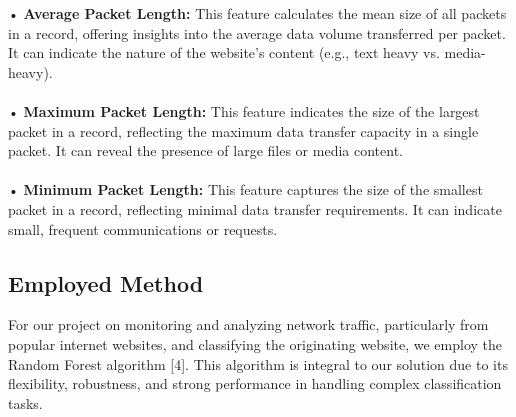 \documentclass[10pt,sigconf,letterpaper,nonacm]{acmart}
\begin{document}
• \textbf{Average Packet Length:} This feature calculates the
mean size of all packets in a record, offering insights into
the average data volume transferred per packet. It can
indicate the nature of the website’s content (e.g., text
heavy vs. media-heavy).\\\\
• \textbf{Maximum Packet Length:} This feature indicates the
size of the largest packet in a record, reflecting the maximum data transfer capacity in a single packet. It can
reveal the presence of large files or media content.\\\\
• \textbf{Minimum Packet Length:} This feature captures the
size of the smallest packet in a record, reflecting minimal
data transfer requirements. It can indicate small, frequent
communications or requests.

\subsection{Employed Method}
For our project on monitoring and analyzing network traffic,
particularly from popular internet websites, and classifying
the originating website, we employ the Random Forest algorithm [4]. This algorithm is integral to our solution due to its
flexibility, robustness, and strong performance in handling
complex classification tasks.
\end{document}
